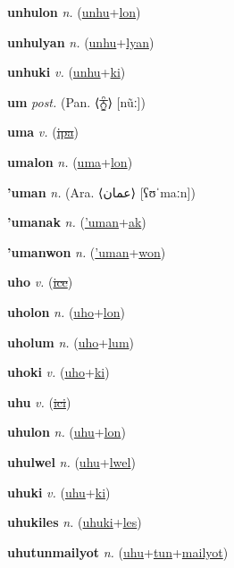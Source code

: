 \textbf{\hypertarget{unhulon}{unhulon}} \textit{n.} (\hyperlink{unhu}{unhu}+\allowbreak \hyperlink{lon}{lon})


\textbf{\hypertarget{unhulyan}{unhulyan}} \textit{n.} (\hyperlink{unhu}{unhu}+\allowbreak \hyperlink{lyan}{lyan})


\textbf{\hypertarget{unhuki}{unhuki}} \textit{v.} (\hyperlink{unhu}{unhu}+\allowbreak \hyperlink{ki}{ki})


\textbf{\hypertarget{um}{um}} \textit{post.} (Pan. ⟨{\gurmukhi{}ਨੂੰ}⟩ [nũː])


\textbf{\hypertarget{uma}{uma}} \textit{v.} (\hyperlink{ipa}{\sout{ipa}})


\textbf{\hypertarget{umalon}{umalon}} \textit{n.} (\hyperlink{uma}{uma}+\allowbreak \hyperlink{lon}{lon})


\textbf{\hypertarget{'uman}{'uman}} \textit{n.} (Ara. ⟨{\arabics{}عمان‎}⟩ [ʕʊˈmaːn])


\textbf{\hypertarget{'umanak}{'umanak}} \textit{n.} (\hyperlink{'uman}{'uman}+\allowbreak \hyperlink{ak}{ak})


\textbf{\hypertarget{'umanwon}{'umanwon}} \textit{n.} (\hyperlink{'uman}{'uman}+\allowbreak \hyperlink{won}{won})


\textbf{\hypertarget{uho}{uho}} \textit{v.} (\hyperlink{ice}{\sout{ice}})


\textbf{\hypertarget{uholon}{uholon}} \textit{n.} (\hyperlink{uho}{uho}+\allowbreak \hyperlink{lon}{lon})


\textbf{\hypertarget{uholum}{uholum}} \textit{n.} (\hyperlink{uho}{uho}+\allowbreak \hyperlink{lum}{lum})


\textbf{\hypertarget{uhoki}{uhoki}} \textit{v.} (\hyperlink{uho}{uho}+\allowbreak \hyperlink{ki}{ki})


\textbf{\hypertarget{uhu}{uhu}} \textit{v.} (\hyperlink{ici}{\sout{ici}})


\textbf{\hypertarget{uhulon}{uhulon}} \textit{n.} (\hyperlink{uhu}{uhu}+\allowbreak \hyperlink{lon}{lon})


\textbf{\hypertarget{uhulwel}{uhulwel}} \textit{n.} (\hyperlink{uhu}{uhu}+\allowbreak \hyperlink{lwel}{lwel})


\textbf{\hypertarget{uhuki}{uhuki}} \textit{v.} (\hyperlink{uhu}{uhu}+\allowbreak \hyperlink{ki}{ki})


\textbf{\hypertarget{uhukiles}{uhukiles}} \textit{n.} (\hyperlink{uhuki}{uhuki}+\allowbreak \hyperlink{les}{les})


\textbf{\hypertarget{uhutunmailyot}{uhutunmailyot}} \textit{n.} (\hyperlink{uhu}{uhu}+\allowbreak \hyperlink{tun}{tun}+\allowbreak \hyperlink{mailyot}{mailyot})


